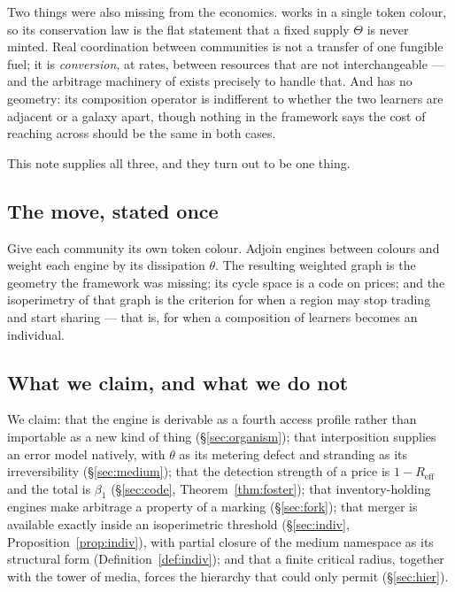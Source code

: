 \documentclass[11pt]{article}
\theoremstyle{plain}
\theoremstyle{definition}
\theoremstyle{remark}
\newcommand{\Reff}{R_{\mathrm{eff}}}
\newcommand{\bt}{\beta_1}
\begin{document}
Two things were also missing from the economics. \cite{compose} works in a
single token colour, so its conservation law is the flat statement that a
fixed supply $\Theta$ is never minted. Real coordination between
communities is not a transfer of one fungible fuel; it is
\emph{conversion}, at rates, between resources that are not interchangeable
--- and the arbitrage machinery of \cite{vtok} exists precisely to handle
that. And \cite{compose} has no geometry: its composition operator is
indifferent to whether the two learners are adjacent or a galaxy apart,
though nothing in the framework says the cost of reaching across should be
the same in both cases.

This note supplies all three, and they turn out to be one thing.

\subsection{The move, stated once}

Give each community its own token colour. Adjoin engines between colours
and weight each engine by its dissipation $\theta$. The resulting weighted
graph is the geometry the framework was missing; its cycle space is a code
on prices; and the isoperimetry of that graph is the criterion for when a
region may stop trading and start sharing --- that is, for when a
composition of learners becomes an individual.

\subsection{What we claim, and what we do not}

We claim: that the engine is derivable as a fourth access profile rather
than importable as a new kind of thing (\S\ref{sec:organism}); that
interposition supplies an error model natively, with $\theta$ as its
metering defect and stranding as its irreversibility
(\S\ref{sec:medium}); that the
detection strength of a price is $1-\Reff$ and the total is $\bt$
(\S\ref{sec:code}, Theorem~\ref{thm:foster}); that inventory-holding
engines make arbitrage a property of a marking (\S\ref{sec:fork}); that
merger is available exactly inside an isoperimetric threshold
(\S\ref{sec:indiv}, Proposition~\ref{prop:indiv}), with partial closure of
the medium namespace as its structural form
(Definition~\ref{def:indiv}); and that a finite critical radius, together
with the tower of media, forces the hierarchy that \cite{compose} could
only permit (\S\ref{sec:hier}).
\end{document}
